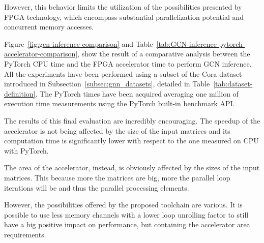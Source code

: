 However, this behavior limits the utilization of the possibilities presented by FPGA technology, which encompass substantial parallelization potential and concurrent memory accesses.

Figure~\ref{fig:gcn-inference-comparison} and Table~\ref{tab:GCN-inference-pytorch-accelerator-comparison}, show the result of a comparative analysis between the PyTorch CPU time and the FPGA accelerator time to perform GCN inference.
All the experiments have been performed using a subset of the Cora dataset introduced in Subsection~\ref{subsec:gnn_datasets}, detailed in Table~\ref{tab:dataset-definition}.
The PyTorch times have been acquired averaging one million of execution time measurements using the PyTorch built-in benchmark API\@.

The results of this final evaluation are incredibly encouraging.
The speedup of the accelerator is not being affected by the size of the input matrices and its computation time is significantly lower with respect to the one measured on CPU with PyTorch.

The area of the accelerator, instead, is obviously affected by the sizes of the input matrices.
This because more the matrices are big, more the parallel loop iterations will be and thus the parallel processing elements.

However, the possibilities offered by the proposed toolchain are various.
It is possible to use less memory channels with a lower loop unrolling factor to still have a big positive impact on performance, but containing the accelerator area requirements.

